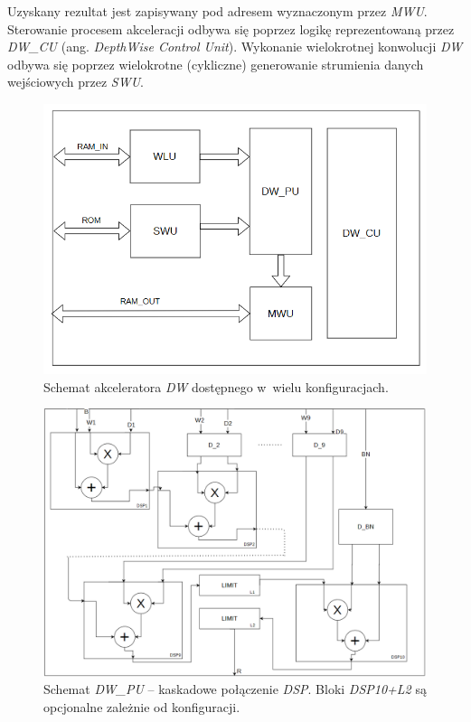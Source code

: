 Uzyskany rezultat jest zapisywany pod adresem wyznaczonym przez \emph{MWU}.
Sterowanie procesem akceleracji odbywa się poprzez logikę reprezentowaną przez \emph{DW\_CU} (ang. \emph{DepthWise Control Unit}).
Wykonanie wielokrotnej konwolucji \emph{DW} odbywa się poprzez wielokrotne (cykliczne) generowanie strumienia danych wejściowych przez \emph{SWU}.
\begin{figure}
    \centering
    \includegraphics[width=0.9\linewidth]{images/DWACC.png}
    \caption{Schemat akceleratora \emph{DW} dostępnego w~wielu konfiguracjach.}
    \label{fig:dwacc}
\end{figure}
\begin{figure}
    \centering
    \includegraphics[width=0.9\linewidth]{images/DW_PU.png}
    \caption{Schemat \emph{DW\_PU} -- kaskadowe połączenie \emph{DSP}.
    Bloki \emph{DSP10+L2} są opcjonalne zależnie od konfiguracji.}
    \label{fig:dwpu}
\end{figure}

